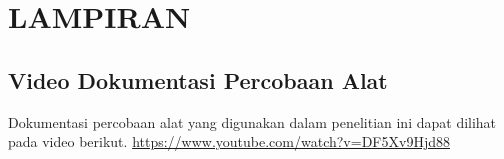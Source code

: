\chapter{LAMPIRAN}

\section{Video Dokumentasi Percobaan Alat}
Dokumentasi percobaan alat yang digunakan dalam penelitian ini dapat dilihat pada video berikut.
\url{https://www.youtube.com/watch?v=DF5Xv9Hjd88}


\newpage

\newpage

\newpage
